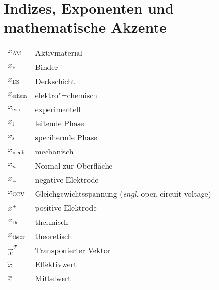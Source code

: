 {\section*{Indizes, Exponenten und mathematische Akzente}

\begin{longtable}{@{}p{\TabulatorVZ}@{}p{\TabulatorTX+\TabulatorEH+2\tabcolsep}@{}}
	$x_{\text{AM}}$				& Aktivmaterial\\
	$x_{\text{b}}$				& Binder\\
	$x_{\text{DS}}$				& Deckschicht\\
	$x_{\text{echem}}$			& elektro"=chemisch\\
	$x_{\text{exp}}$			& experimentell\\
	$x_{\text{l}}$				& leitende Phase\\
	$x_{\text{s}}$				& specihernde Phase\\
	$x_{\text{mech}}$			& mechanisch\\
	$x_n$						& Normal zur Oberfläche	\\
	$x_{-}$						& negative Elektrode \\
	$x_{\text{OCV}}$			& Gleichgewichtsspannung (\textit{engl.} open-circuit voltage) \\
	$x^{+}$						& positive Elektrode \\
	$x_{\text{th}}$				& thermisch \\
	$x_{\text{theor}}$			& theoretisch \\
	$\vec{x}^T$					& Transponierter Vektor	\\
	$\tilde{x}$				    & Effektivwert 	\\
	$\overline{x}$					& Mittelwert
\end{longtable}

} %


\clearpage